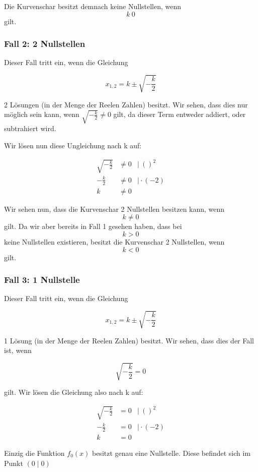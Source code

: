 \documentclass[12pt,a4paper]{article}
\begin{document}
Die Kurvenschar besitzt demnach keine Nullstellen, wenn $$k\>0$$ gilt.

\subsubsection{Fall 2: 2 Nullstellen}


Dieser Fall tritt ein, wenn die Gleichung 

$$ x_{1,2} = k \pm \sqrt {-\frac k 2} $$

2 Lösungen (in der Menge der Reelen Zahlen) besitzt. Wir sehen, dass dies nur möglich sein kann, wenn $\sqrt {-\frac k 2} \neq 0 $ gilt, da dieser Term entweder addiert, oder subtrahiert wird.

Wir lösen nun diese Ungleichung nach k auf:

$$
\begin{aligned}
    \sqrt{-\frac{k}{2}} & \neq 0 & \mid \> ()^2 \\
    - \frac{k}{2} & \neq 0 & \mid \cdot (-2) \\
    k & \neq 0
\end{aligned}
$$

Wir sehen nun, dass die Kurvenschar 2 Nullstellen besitzen kann, wenn $$k\neq 0$$ gilt. Da wir aber bereits in Fall 1 gesehen haben, dass bei $$k > 0$$ keine Nullstellen existieren, besitzt die Kurvenschar 2 Nullstellen, wenn $$k < 0$$ gilt.

\subsubsection{Fall 3: 1 Nullstelle}

Dieser Fall tritt ein, wenn die Gleichung 

$$  x_{1,2} = k \pm \sqrt {-\frac k 2} $$

1 Lösung (in der Menge der Reelen Zahlen) besitzt. Wir sehen, dass dies der Fall ist, wenn

$$ \sqrt {-\frac k 2} = 0 $$

gilt. Wir lösen die Gleichung also nach k auf:

$$
\begin{aligned}
    \sqrt{-\frac{k}{2}} & = 0 & \mid \> ()^2 \\
    - \frac{k}{2} & = 0 & \mid \cdot (-2) \\
    k & = 0
\end{aligned}
$$

Einzig die Funktion $f_0(x)$ besitzt genau eine Nullstelle. Diese befindet sich im Punkt $(0 \mid 0)$ 
\end{document}
